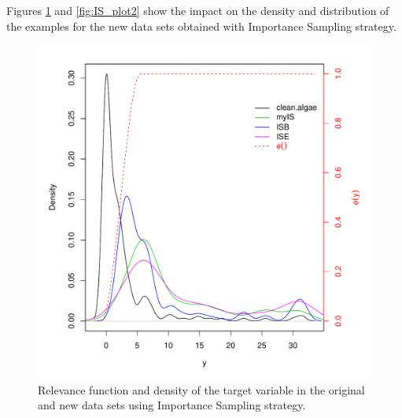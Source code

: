\documentclass[10pt,a4paper]{article}\usepackage[]{graphicx}\usepackage[]{color}
\makeatletter
\def\maxwidth{ %
  \ifdim\Gin@nat@width>\linewidth
    \linewidth
  \else
    \Gin@nat@width
  \fi
}
\newenvironment{knitrout}{}{} %
\makeatother
\begin{document}
Figures \ref{fig:IS_plot1} and \ref{fig:IS_plot2} show the impact on the density and distribution of the examples for the new data sets obtained with Importance Sampling strategy.
\begin{knitrout}\footnotesize
{}\color{fgcolor}\begin{figure}

{\centering \includegraphics[width=\maxwidth]{figures/UBL-IS_plot1-1} 

}

\caption[Relevance function and density of the target variable in the original and new data sets using Importance Sampling strategy]{Relevance function and density of the target variable in the original and new data sets using Importance Sampling strategy.}\label{fig:IS_plot1}
\end{figure}


\end{knitrout}
\end{document}
